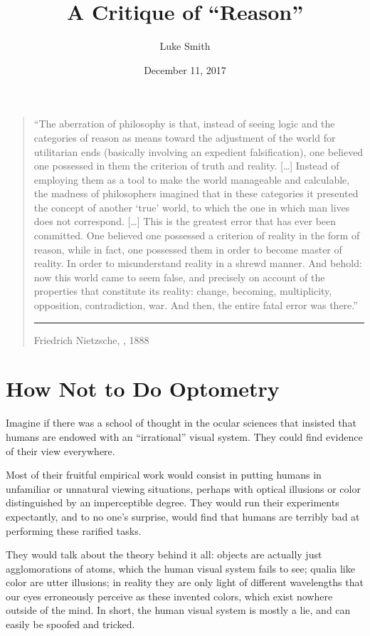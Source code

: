 \documentclass{article}
\title{A Critique of ``Reason''}
\author{Luke Smith}
\date{December 11, 2017}
\begin{document}
\maketitle

\begin{quote}
``The aberration of philosophy is that, instead of seeing logic and the categories of reason as means toward the adjustment of the world for utilitarian ends (basically involving an expedient falsification), one believed one possessed in them the criterion of truth and reality.
	[\ldots]
Instead of employing them as a tool to make the world manageable and calculable, the madness of philosophers imagined that in these categories it presented the concept of another `true' world, to which the one in which man lives does not correspond.
	[\ldots]
This is the greatest error that has ever been committed.
One believed one possessed a criterion of reality in the form of reason, while in fact, one possessed them in order to become master of reality.
In order to misunderstand reality in a shrewd manner.
And behold: now this world came to seem false, and precisely on account of the properties that constitute its reality: change, becoming, multiplicity, opposition, contradiction, war.
And then, the entire fatal error was there.''
	\vspace{.25cm}\hrule
	\hfill Friedrich Nietzsche, , 1888
\end{quote}

\onehalfspacing

\section{How Not to Do Optometry}

Imagine if there was a school of thought in the ocular sciences that insisted that humans are endowed with an ``irrational'' visual system.
They could find evidence of their view everywhere.

Most of their fruitful empirical work would consist in putting humans in unfamiliar or unnatural viewing situations, perhaps with optical illusions or color distinguished by an imperceptible degree.
They would run their experiments expectantly, and to no one's surprise, would find that humans are terribly bad at performing these rarified tasks.

They would talk about the theory behind it all: objects are actually just agglomorations of atoms, which the human visual system fails to see; qualia like color are utter illusions; in reality they are only light of different wavelengths that our eyes erroneously perceive as these invented colors, which exist nowhere outside of the mind.
In short, the human visual system is mostly a lie, and can easily be spoofed and tricked.
\end{document}
